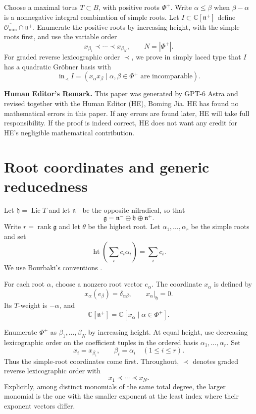 \documentclass[12pt]{article}
\theoremstyle{definition}
\DeclareMathOperator{\height}{ht}
\DeclareMathOperator{\inid}{in}
\newcommand{\C}{\mathbb C}
\newcommand{\g}{\mathfrak g}
\newcommand{\h}{\mathfrak h}
\newcommand{\n}{\mathfrak n^{+}}
\newcommand{\nm}{\mathfrak n^-}
\newcommand{\oc}{\overline{\mathcal O_{\min}}}
\begin{document}
Choose a maximal torus $T\subset B$, with positive roots $\Phi^+$. Write $\alpha\leq\beta$ when $\beta-\alpha$ is a nonnegative integral combination of simple roots. Let $I\subset\C[\n]$ define $\oc\cap\n$. Enumerate the positive roots by increasing height, with the simple roots first, and use the variable order
$$
    x_{\beta_1}\prec\cdots\prec x_{\beta_N},\qquad N=|\Phi^+|.
$$
For graded reverse lexicographic order $\prec$, we prove in simply laced type that $I$ has a quadratic Gr\"obner basis with
$$
    \inid_\prec I=(x_\alpha x_\beta\mid\alpha,\beta\in\Phi^+\text{ are incomparable}).
$$
\par\medskip
\noindent\textbf{Human Editor's Remark.}
This paper was generated by GPT-6 Astra and revised together with the Human Editor (HE), Boming Jia. HE has found no mathematical errors in this paper. If any errors are found later, HE will take full responsibility. If the proof is indeed correct, HE does not want any credit for HE's negligible mathematical contribution.

\section{Root coordinates and generic reducedness}

Let $\h=\operatorname{Lie}T$ and let $\nm$ be the opposite nilradical, so that
$$
    \g=\nm\oplus\h\oplus\n.
$$
Write $r=\operatorname{rank}\g$ and let $\theta$ be the highest root. Let $\alpha_1,\ldots,\alpha_r$ be the simple roots and set
$$
    \height\left(\sum_i c_i\alpha_i\right)=\sum_i c_i.
$$
We use Bourbaki's conventions \cite[Chapter~VI]{Bou02}.

For each root $\alpha$, choose a nonzero root vector $e_\alpha$. The coordinate $x_\alpha$ is defined by
$$
    x_\alpha(e_\beta)=\delta_{\alpha\beta},\qquad x_\alpha|_\h=0.
$$
Its $T$-weight is $-\alpha$, and
$$
    \C[\n]=\C[x_\alpha\mid\alpha\in\Phi^+].
$$

Enumerate $\Phi^+$ as $\beta_1,\ldots,\beta_N$ by increasing height. At equal height, use decreasing lexicographic order on the coefficient tuples in the ordered basis $\alpha_1,\ldots,\alpha_r$. Set
$$
    x_i=x_{\beta_i},\qquad \beta_i=\alpha_i\quad(1\leq i\leq r).
$$
Thus the simple-root coordinates come first. Throughout, $\prec$ denotes graded reverse lexicographic order with
$$
    x_1\prec\cdots\prec x_N.
$$
Explicitly, among distinct monomials of the same total degree, the larger monomial is the one with the smaller exponent at the least index where their exponent vectors differ.
\end{document}
